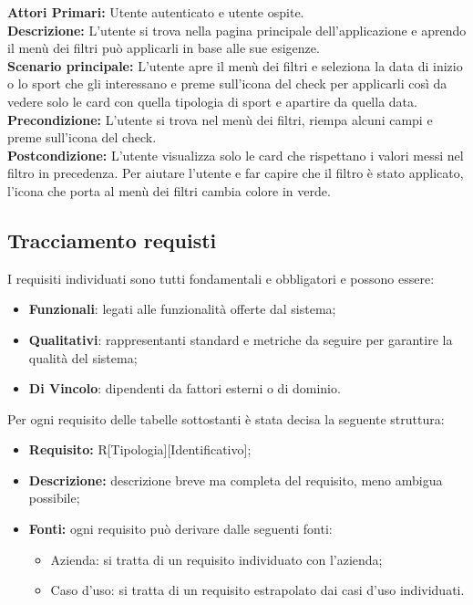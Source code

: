 \textbf{Attori Primari:} Utente autenticato e utente ospite.\\
\textbf{Descrizione:} L'utente si trova nella pagina principale dell'applicazione e aprendo il menù dei filtri può applicarli in base alle sue esigenze.\\
\textbf{Scenario principale:} L'utente apre il menù dei filtri e seleziona la data di inizio o lo sport che gli interessano e preme sull'icona del check per applicarli così da vedere solo le card con quella tipologia di sport e apartire da quella data.\\
\textbf{Precondizione:} L'utente si trova nel menù dei filtri, riempa alcuni campi e preme sull'icona del check.\\
\textbf{Postcondizione:} L'utente visualizza solo le card che rispettano i valori messi nel filtro in precedenza. Per aiutare l'utente e far capire che il filtro è stato applicato, l'icona che porta al menù dei filtri cambia colore in verde.\\

\newpage

\subsection{Tracciamento requisti}
I requisiti individuati sono tutti fondamentali e obbligatori e possono essere:
\begin{itemize}
	\item \textbf{Funzionali}: legati alle funzionalità offerte dal sistema;
	\item \textbf{Qualitativi}: rappresentanti standard e metriche da seguire per garantire la qualità del sistema;
	\item \textbf{Di Vincolo}: dipendenti da fattori esterni o di dominio.
\end{itemize}
Per ogni requisito delle tabelle sottostanti è stata decisa la seguente struttura: 
\begin{itemize}
	\item\textbf{Requisito:} R[Tipologia][Identificativo];
	\item\textbf{Descrizione:} descrizione breve ma completa del requisito, meno ambigua possibile;
	\item\textbf{Fonti:} ogni requisito può derivare dalle seguenti fonti:
	\begin{itemize}
		\item Azienda: si tratta di un requisito individuato con l'azienda;
		\item Caso d'uso: si tratta di un requisito estrapolato dai casi d'uso individuati.
	\end{itemize}
\end{itemize}

